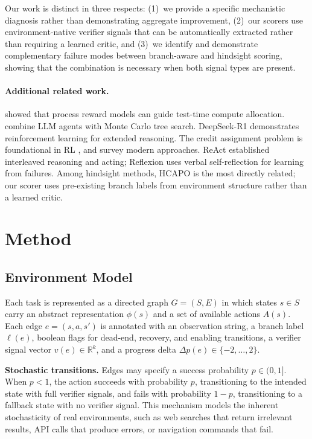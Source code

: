 \documentclass[11pt]{article}
\begin{document}
Our work is distinct in three respects: (1)~we provide a specific mechanistic diagnosis rather than demonstrating aggregate improvement, (2)~our scorers use environment-native verifier signals that can be automatically extracted rather than requiring a learned critic, and (3)~we identify and demonstrate complementary failure modes between branch-aware and hindsight scoring, showing that the combination is necessary when both signal types are present.

\paragraph{Additional related work.}
\citet{snell2024scaling} showed that process reward models can guide test-time compute allocation. \citet{zhou2024language} combine LLM agents with Monte Carlo tree search. DeepSeek-R1 \citep{deepseek2025} demonstrates reinforcement learning for extended reasoning. The credit assignment problem is foundational in RL \citep{sutton2018reinforcement}, and \citet{pignatelli2023survey} survey modern approaches. ReAct \citep{yao2022react} established interleaved reasoning and acting; Reflexion \citep{shinn2023reflexion} uses verbal self-reflection for learning from failures. Among hindsight methods, HCAPO \citep{tan2026hindsight} is the most directly related; our scorer uses pre-existing branch labels from environment structure rather than a learned critic.

\section{Method}
\label{sec:method}

\subsection{Environment Model}

Each task is represented as a directed graph $G = (S, E)$ in which states $s \in S$ carry an abstract representation $\phi(s)$ and a set of available actions $A(s)$. Each edge $e = (s, a, s')$ is annotated with an observation string, a branch label $\ell(e)$, boolean flags for dead-end, recovery, and enabling transitions, a verifier signal vector $v(e) \in \mathbb{R}^k$, and a progress delta $\Delta p(e) \in \{-2, \ldots, 2\}$.

\textbf{Stochastic transitions.} Edges may specify a success probability $p \in (0,1]$. When $p < 1$, the action succeeds with probability $p$, transitioning to the intended state with full verifier signals, and fails with probability $1-p$, transitioning to a fallback state with no verifier signal. This mechanism models the inherent stochasticity of real environments, such as web searches that return irrelevant results, API calls that produce errors, or navigation commands that fail.
\end{document}
